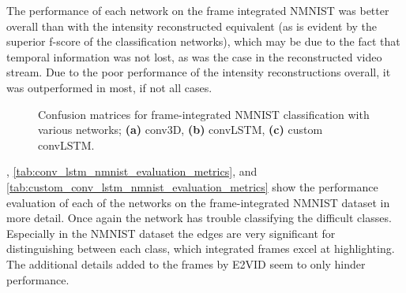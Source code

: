 The performance of each network on the frame integrated NMNIST was better overall than with the intensity reconstructed equivalent (as is evident by the superior f-score of the classification networks), which may be due to the fact that temporal information was not lost, as was the case in the reconstructed video stream. Due to the poor performance of the intensity reconstructions overall, it was outperformed in most, if not all cases.

\begin{figure}[htb]%
    \centering
    \qquad
    \qquad
    \caption{Confusion matrices for frame-integrated NMNIST classification with various networks; \textbf{(a)} conv3D, \textbf{(b)} convLSTM, \textbf{(c)} custom convLSTM.}%
    \label{fig:nmnist_c_matrices}%
\end{figure}

, \cref{tab:conv_lstm_nmnist_evaluation_metrics}, and \cref{tab:custom_conv_lstm_nmnist_evaluation_metrics} show the performance evaluation of each of the networks on the frame-integrated NMNIST dataset in more detail. Once again the network has trouble classifying the difficult classes. Especially in the NMNIST dataset the edges are very significant for distinguishing between each class, which integrated frames excel at highlighting. The additional details added to the frames by E2VID seem to only hinder performance.

